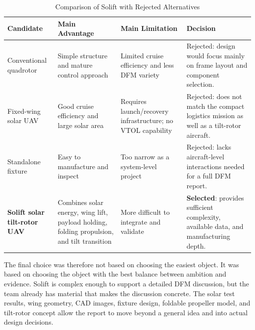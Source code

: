 \begin{table}[htbp]
  \centering
  \small
  \caption{Comparison of Solift with Rejected Alternatives}
  \label{tab:alternative-comparison}
  \begin{tabularx}{\textwidth}{L{3cm} L{3.5cm} L{3.5cm} X}
    \toprule
    \textbf{Candidate} & \textbf{Main Advantage} & \textbf{Main Limitation} & \textbf{Decision} \\
    \midrule
    Conventional quadrotor &
      Simple structure and mature control approach &
      Limited cruise efficiency and less DFM variety &
      Rejected: design would focus mainly on frame layout and component selection. \\
    Fixed-wing solar UAV &
      Good cruise efficiency and large solar area &
      Requires launch/recovery infrastructure; no VTOL capability &
      Rejected: does not match the compact logistics mission as well as a tilt-rotor aircraft. \\
    Standalone fixture &
      Easy to manufacture and inspect &
      Too narrow as a system-level project &
      Rejected: lacks aircraft-level interactions needed for a full DFM report. \\
    \textbf{Solift solar tilt-rotor UAV} &
      Combines solar energy, wing lift, payload holding, folding propulsion, and tilt transition &
      More difficult to integrate and validate &
      \textbf{Selected}: provides sufficient complexity, available data, and manufacturing depth. \\
    \bottomrule
  \end{tabularx}
\end{table}

The final choice was therefore not based on choosing the easiest object. It was based on choosing the object with the best balance between ambition and evidence. Solift is complex enough to support a detailed DFM discussion, but the team already has material that makes the discussion concrete. The solar test results, wing geometry, CAD images, fixture design, foldable propeller model, and tilt-rotor concept allow the report to move beyond a general idea and into actual design decisions.
